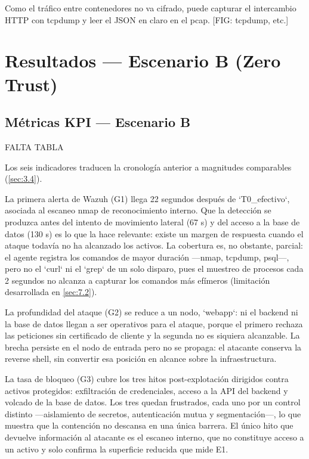 \documentclass[11pt,spanish,listoffigures,listoftables]{tfgetsinf}
\begin{document}
        Como el tráfico entre contenedores no va cifrado, puede capturar el intercambio HTTP con tcpdump y leer el JSON en claro en el pcap. [FIG: tcpdump, etc.]

        
    \section{Resultados — Escenario B (Zero Trust)}
        
        \subsection{Métricas KPI — Escenario B}
        FALTA TABLA

        Los seis indicadores traducen la cronología anterior a magnitudes comparables (\cref{sec:3.4}).
        
        La primera alerta de Wazuh (G1) llega 22 segundos después de `T0\_efectivo`, asociada al escaneo nmap de reconocimiento interno. Que la detección se produzca antes del intento de movimiento lateral (67 s) y del acceso a la base de datos (130 s) es lo que la hace relevante: existe un margen de respuesta cuando el ataque todavía no ha alcanzado los activos. La cobertura es, no obstante, parcial: el agente registra los comandos de mayor duración —nmap, tcpdump, psql—, pero no el `curl` ni el `grep` de un solo disparo, pues el muestreo de procesos cada 2 segundos no alcanza a capturar los comandos más efímeros (limitación desarrollada en \cref{sec:7.2}).
        
        La profundidad del ataque (G2) se reduce a un nodo, `webapp`: ni el backend ni la base de datos llegan a ser operativos para el ataque, porque el primero rechaza las peticiones sin certificado de cliente y la segunda no es siquiera alcanzable. La brecha persiste en el nodo de entrada pero no se propaga: el atacante conserva la reverse shell, sin convertir esa posición en alcance sobre la infraestructura.
        
        La tasa de bloqueo (G3) cubre los tres hitos post-explotación dirigidos contra activos protegidos: exfiltración de credenciales, acceso a la API del backend y volcado de la base de datos. Los tres quedan frustrados, cada uno por un control distinto —aislamiento de secretos, autenticación mutua y segmentación—, lo que muestra que la contención no descansa en una única barrera. El único hito que devuelve información al atacante es el escaneo interno, que no constituye acceso a un activo y solo confirma la superficie reducida que mide E1.
        
\end{document}
